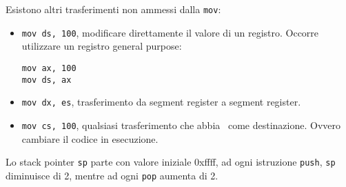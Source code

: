 \documentclass[../ace.tex]{subfiles}
\begin{document}
Esistono altri trasferimenti non ammessi dalla \lstinline{mov}:
\begin{itemize}
    \item \lstinline{mov ds, 100}, modificare direttamente il valore di un registro.
        Occorre utilizzare un registro general purpose:
\begin{lstlisting}
mov ax, 100
mov ds, ax
\end{lstlisting}

    \item \lstinline{mov dx, es}, trasferimento da segment register a segment register.
    \item \lstinline{mov cs, 100}, qualsiasi trasferimento che abbia \cs\ come destinazione.
        Ovvero cambiare il codice in esecuzione.
\end{itemize}
Lo stack pointer \lstinline{sp} parte con valore iniziale 0xffff, ad ogni istruzione \lstinline{push},
\lstinline{sp} diminuisce di 2, mentre ad ogni \lstinline{pop} aumenta di 2.
\end{document}
